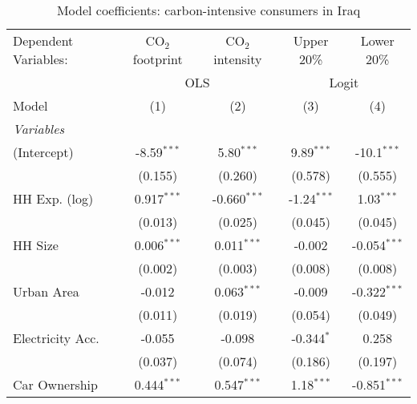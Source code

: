
\begin{table}[htbp!]
   \centering
   \small
   \begin{adjustbox}{width = 1\textwidth, max height = 0.95\textheight, center}
      \begin{threeparttable}[b]
         \caption{\label{tab:Logit_1_IRQ} Model coefficients: carbon-intensive consumers in Iraq}
         \begin{tabular}{lcccc}
            \tabularnewline \midrule \midrule
            Dependent Variables: & CO$_{2}$ footprint & CO$_{2}$ intensity & Upper 20\%    & Lower 20\%\\   
             & \multicolumn{2}{c}{OLS} & \multicolumn{2}{c}{Logit} \\ 
            Model                & (1)                & (2)                & (3)           & (4)\\  
            \midrule
            \emph{Variables}\\
            (Intercept)          & -8.59$^{***}$      & 5.80$^{***}$       & 9.89$^{***}$  & -10.1$^{***}$\\   
                                 & (0.155)            & (0.260)            & (0.578)       & (0.555)\\   
            HH Exp. (log)        & 0.917$^{***}$      & -0.660$^{***}$     & -1.24$^{***}$ & 1.03$^{***}$\\   
                                 & (0.013)            & (0.025)            & (0.045)       & (0.045)\\   
            HH Size              & 0.006$^{***}$      & 0.011$^{***}$      & -0.002        & -0.054$^{***}$\\   
                                 & (0.002)            & (0.003)            & (0.008)       & (0.008)\\   
            Urban Area           & -0.012             & 0.063$^{***}$      & -0.009        & -0.322$^{***}$\\   
                                 & (0.011)            & (0.019)            & (0.054)       & (0.049)\\   
            Electricity Acc.     & -0.055             & -0.098             & -0.344$^{*}$  & 0.258\\   
                                 & (0.037)            & (0.074)            & (0.186)       & (0.197)\\   
            Car Ownership        & 0.444$^{***}$      & 0.547$^{***}$      & 1.18$^{***}$  & -0.851$^{***}$\\   

\end{tabular}
\end{threeparttable}
\end{adjustbox}
\end{table}
